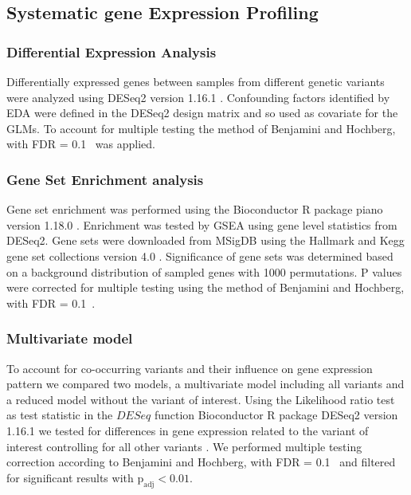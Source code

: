 \subsection{Systematic gene Expression Profiling}

\subsubsection{Differential Expression Analysis}
Differentially expressed genes between samples from different genetic variants were analyzed using DESeq2 version 1.16.1 \citep{Love2014}. Confounding factors identified by EDA were defined in the DESeq2 design matrix and so used as covariate for the GLMs. To account for multiple testing the method of Benjamini and Hochberg, with FDR = 0.1~\citep{Benjamini} was applied.   

\subsubsection{Gene Set Enrichment analysis}
Gene set enrichment was performed using the Bioconductor R package piano version 1.18.0 \citep{Varemo}. Enrichment was tested by GSEA using gene level statistics from DESeq2. Gene sets were downloaded from MSigDB using the Hallmark and Kegg gene set collections version 4.0 \citep{Liberzon2015, Kanehisa2017}. Significance of gene sets was determined based on a background distribution of sampled genes with 1000 permutations. P values were corrected for multiple testing using the method of Benjamini and Hochberg, with FDR = 0.1~\citep{Benjamini}.


\subsubsection{Multivariate model}
To account for co-occurring variants and their influence on gene expression pattern we compared two models, a multivariate model including all variants and a reduced model without the variant of interest. Using the Likelihood ratio test as test statistic in the $DESeq$ function Bioconductor R package DESeq2 version 1.16.1 we tested for differences in gene expression related to the variant of interest controlling for all other variants \citep{Love2014}. We performed multiple testing correction according to Benjamini and Hochberg, with FDR = 0.1~\citep{Benjamini} and filtered for significant results with $\text{p}_\text{adj} < 0.01$.

